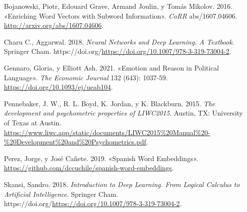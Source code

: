 \documentclass[
  12pt,
]{article}
\newlength{\cslhangindent}
\newlength{\cslentryspacingunit} %
\newenvironment{CSLReferences}[2] %
 {%
  \setlength{\parindent}{0pt}
  \ifodd #1
  \let\oldpar\par
  \def\par{\hangindent=\cslhangindent\oldpar}
  \fi
  \setlength{\parskip}{#2\cslentryspacingunit}
 }%
 {}
\begin{document}
\hypertarget{refs}{}
\begin{CSLReferences}{1}{0}
\leavevmode{}%
Bojanowski, Piotr, Edouard Grave, Armand Joulin, y Tomás Mikolov. 2016.
{«Enriching Word Vectors with Subword Information»}. \emph{CoRR}
abs/1607.04606. \url{http://arxiv.org/abs/1607.04606}.

\leavevmode{}%
Charu C., Aggarwal. 2018. \emph{Neural Networks and Deep Learning. A
Textbook}. Springer Cham.
https://doi.org/\url{https://doi.org/10.1007/978-3-319-73004-2}.

\leavevmode{}%
Gennaro, Gloria, y Elliott Ash. 2021. {«{Emotion and Reason in Political
Language}»}. \emph{The Economic Journal} 132 (643): 1037-59.
\url{https://doi.org/10.1093/ej/ueab104}.

\leavevmode{}%
Pennebaker, J. W., R. L. Boyd, K. Jordan, y K. Blackburn. 2015.
\emph{The development and psychometric properties of LIWC2015}. Austin,
TX: University of Texas at Austin.
\url{https://www.liwc.app/static/documents/LIWC2015\%20Manual\%20-\%20Development\%20and\%20Psychometrics.pdf}.

\leavevmode{}%
Perez, Jorge, y José Cañete. 2019. {«Spanish Word Embeddings»}.
\url{https://github.com/dccuchile/spanish-word-embeddings}.

\leavevmode{}%
Skansi, Sandro. 2018. \emph{Introduction to Deep Learning. From Logical
Calculus to Artificial Intelligence}. Springer Cham.
https://doi.org/\url{https://doi.org/10.1007/978-3-319-73004-2}.

\end{CSLReferences}
\end{document}
